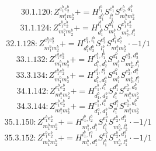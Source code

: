 \documentclass[letterpaper,10pt,fleqn,leqno,onecolumn]{article}
\begin{document}
\begin{equation} \;\;\;\;\;\;  30.1.120: Z^{e_{1}^{b}e_{2}^{b}}_{m_{1}^{b}m_{2}^{b}}+=H^{l_{1}^{b}}_{d_{1}^{b}}S^{e_{1}^{b}}_{l_{1}^{b}}S^{e_{2}^{b},d_{1}^{b}}_{m_{1}^{b}m_{2}^{b}} \end{equation}
\begin{equation} \;\;\;\;\;\;  31.1.124: Z^{e_{1}^{b}e_{2}^{b}}_{m_{1}^{b}m_{2}^{b}}+=H^{l_{1}^{b}}_{d_{1}^{b}}S^{d_{1}^{b}}_{m_{1}^{b}}S^{e_{1}^{b}e_{2}^{b}}_{m_{2}^{b},l_{1}^{b}} \end{equation}
\begin{equation} \;\;\;\;\;\;  32.1.128: Z^{e_{1}^{b}e_{2}^{b}}_{m_{1}^{b}m_{2}^{b}}+=H^{e_{1}^{b},l_{1}^{b}}_{d_{1}^{b}d_{2}^{b}}S^{e_{2}^{b}}_{l_{1}^{b}}S^{d_{1}^{b}d_{2}^{b}}_{m_{1}^{b}m_{2}^{b}}\cdot -1/1 \end{equation}
\begin{equation} \;\;\;\;\;\;  33.1.132: Z^{e_{1}^{b}e_{2}^{b}}_{m_{1}^{b}m_{2}^{b}}+=H^{e_{1}^{b},l_{1}^{b}}_{d_{1}^{b},d_{2}^{b}}S^{d_{1}^{b}}_{m_{1}^{b}}S^{e_{2}^{b},d_{2}^{b}}_{m_{2}^{b},l_{1}^{b}} \end{equation}
\begin{equation} \;\;\;\;\;\;  33.3.134: Z^{e_{1}^{b}e_{2}^{b}}_{m_{1}^{b}m_{2}^{b}}+=H^{e_{1}^{b},l_{1}^{a}}_{d_{1}^{b},d_{1}^{a}}S^{d_{1}^{b}}_{m_{1}^{b}}S^{e_{2}^{b},d_{1}^{a}}_{m_{2}^{b},l_{1}^{a}} \end{equation}
\begin{equation} \;\;\;\;\;\;  34.1.142: Z^{e_{1}^{b}e_{2}^{b}}_{m_{1}^{b}m_{2}^{b}}+=H^{e_{1}^{b},l_{1}^{b}}_{d_{1}^{b},d_{2}^{b}}S^{d_{1}^{b}}_{l_{1}^{b}}S^{e_{2}^{b},d_{2}^{b}}_{m_{1}^{b}m_{2}^{b}} \end{equation}
\begin{equation} \;\;\;\;\;\;  34.3.144: Z^{e_{1}^{b}e_{2}^{b}}_{m_{1}^{b}m_{2}^{b}}+=H^{e_{1}^{b},l_{1}^{a}}_{d_{1}^{a},d_{1}^{b}}S^{d_{1}^{a}}_{l_{1}^{a}}S^{e_{2}^{b},d_{1}^{b}}_{m_{1}^{b}m_{2}^{b}} \end{equation}
\begin{equation} \;\;\;\;\;\;  35.1.150: Z^{e_{1}^{b}e_{2}^{b}}_{m_{1}^{b}m_{2}^{b}}+=H^{l_{1}^{b},l_{2}^{b}}_{m_{1}^{b},d_{1}^{b}}S^{e_{1}^{b}}_{l_{1}^{b}}S^{e_{2}^{b},d_{1}^{b}}_{m_{2}^{b},l_{2}^{b}}\cdot -1/1 \end{equation}
\begin{equation} \;\;\;\;\;\;  35.3.152: Z^{e_{1}^{b}e_{2}^{b}}_{m_{1}^{b}m_{2}^{b}}+=H^{l_{1}^{b},l_{1}^{a}}_{m_{1}^{b},d_{1}^{a}}S^{e_{1}^{b}}_{l_{1}^{b}}S^{e_{2}^{b},d_{1}^{a}}_{m_{2}^{b},l_{1}^{a}}\cdot -1/1 \end{equation}
\end{document}
